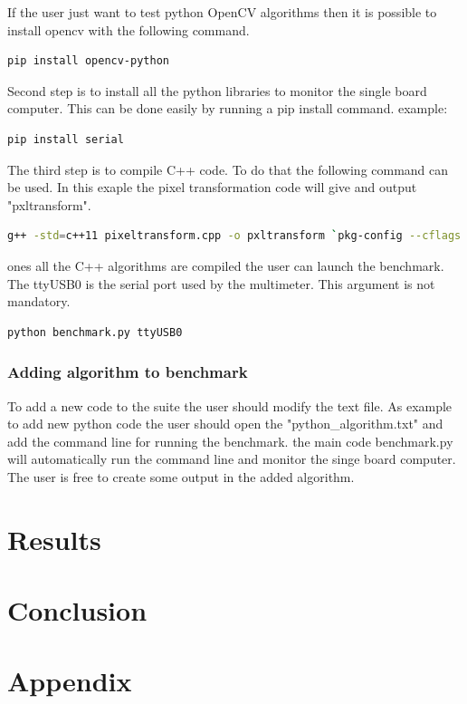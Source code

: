 \documentclass[english]{book_template} %
\begin{document}
If the user just want to test python OpenCV algorithms then it is possible to install opencv with the following command. 
\begin{lstlisting}[language=bash]
pip install opencv-python
\end{lstlisting} 

Second step is to install all the python libraries to monitor the single board computer. This can be done easily by running a pip install command. 
example: 
\begin{lstlisting}[language=bash]
pip install serial
\end{lstlisting}

The third step is to compile C++ code. To do that the following command can be used. In this exaple the pixel transformation code will give and output "pxltransform".
\begin{lstlisting}[language=bash]
g++ -std=c++11 pixeltransform.cpp -o pxltransform `pkg-config --cflags --libs opencv`
\end{lstlisting}

ones all the C++ algorithms are compiled the user can launch the benchmark. The ttyUSB0 is the serial port used by the multimeter. This argument is not mandatory. 

\begin{lstlisting}[language=bash]
python benchmark.py ttyUSB0
\end{lstlisting}


\subsection{Adding algorithm to benchmark}

To add a new code to the suite the user should modify the text file. As example to add new python code the user should open the "python\_algorithm.txt" and add the command line for running the benchmark. the main code benchmark.py will automatically run the command line and monitor the singe board computer. The user is free to create some output in the added algorithm.


\chapter{Results}   

\chapter{Conclusion}
 
\printbibliography
\thispagestyle{plain}
\newpage
{}
\chapter{Appendix}
\appendix



\end{document}
